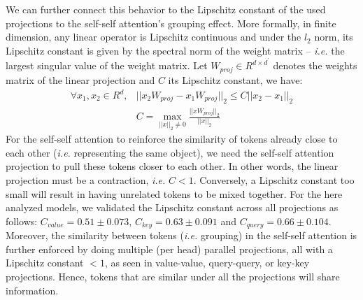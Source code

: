 \documentclass[10pt,twocolumn,letterpaper]{article}
\begin{document}
We can further connect this behavior to the Lipschitz constant of the used projections to the self-self attention's grouping effect.
More formally, in finite dimension, any linear operator is Lipschitz continuous and under the $l_2$ norm, its Lipschitz constant is given by the spectral norm of the weight matrix -- \textit{i.e.} the largest singular value of the weight matrix.
Let $W_{proj} \in R^{d \times d^\prime}$ denotes the weights matrix of the linear projection and $C$ its Lipschitz constant, we have:
\begin{equation}
\begin{aligned}    
 \forall x_1, x_2 \in R^{d}, &||x_2 W_{proj} - x_1W_{proj}||_2 \leq C || x_2 - x_1||_2 \\
 &C =  \max_{||x||_2 \neq 0} \frac{||xW_{proj}||_2}{||x||_2}
\end{aligned}
\end{equation}
For the self-self attention to reinforce the similarity of tokens already close to each other (\textit{i.e.} representing the same object), we need the self-self attention projection to pull these tokens closer to each other. In other words, the linear projection must be a contraction, \textit{i.e.} $C<1$. Conversely, a Lipschitz constant too small will result in having unrelated tokens to be mixed together. For the here analyzed models, we validated the Lipschitz constant across all projections as follows: $C_{value}=0.51 \pm 0.073$, $C_{key}=0.63 \pm 0.091$ and $C_{query}=0.66 \pm 0.104$.  
Moreover, the similarity between tokens (\textit{i.e.} grouping) in the self-self attention is further enforced by doing multiple (per head) parallel projections, all with a Lipschitz constant $<1$, as seen in value-value, query-query, or key-key projections.
Hence, tokens that are similar under all the projections will share information.
\end{document}
